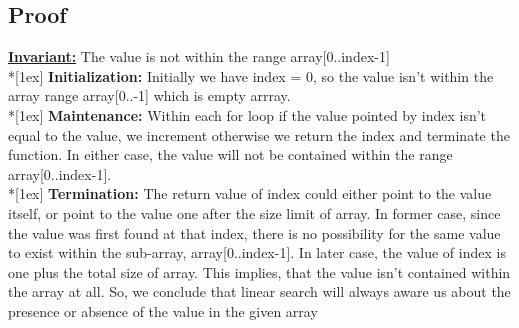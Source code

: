 \documentclass{article}
\begin{document}
\subsection{Proof}

\textbf{\underline{Invariant:}} The value is not within the range
array[0..index-1]
\\*[1ex]
\textbf{Initialization:} Initially we have index = 0, so the value isn't within the array range array[0..-1] which is empty arrray.
\\*[1ex]
\textbf{Maintenance:} Within each for loop if the value pointed by index isn't equal to the value, we increment otherwise we return the index and terminate the function. In either case, the value will not be contained within the range array[0..index-1].
\\*[1ex]
\textbf{Termination:} The return value of index could either point to the value itself, or point to the value one after the size limit of array. In former case, since the value was first found at that index, there is no possibility for the same value to exist within the sub-array, array[0..index-1]. In later case, the value of index is one plus the total size of array. This implies, that the value isn't contained within the array at all.
So, we conclude that linear search will always aware us about the presence or absence of the value in the given array
\end{document}
